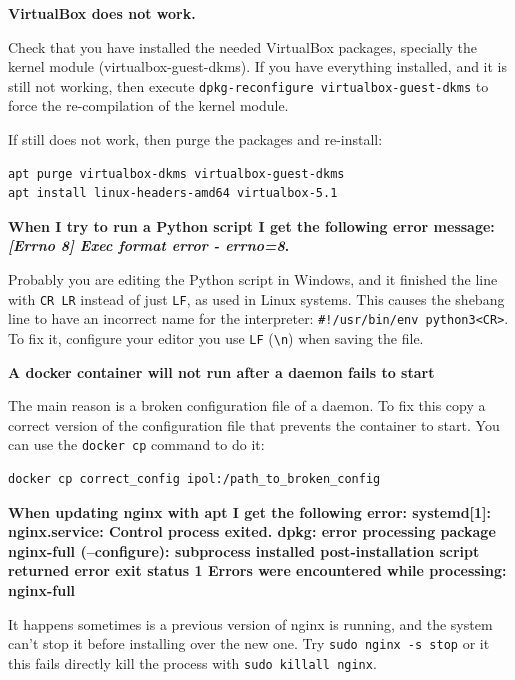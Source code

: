 \documentclass[a4paper,12pt]{article}
\begin{document}
\textbf{VirtualBox does not work.}

Check that you have installed the needed VirtualBox packages, specially the kernel module (virtualbox-guest-dkms).
If you have everything installed, and it is still not working, then execute {\tt dpkg-reconfigure virtualbox-guest-dkms} to force the re-compilation of the kernel module.

If still does not work, then purge the packages and re-install:

\begin{verbatim}
apt purge virtualbox-dkms virtualbox-guest-dkms
apt install linux-headers-amd64 virtualbox-5.1
\end{verbatim}
\vspace{0.5cm}

\textbf{When I try to run a Python script I get the following error message: \emph{[Errno 8] Exec format error - errno=8}.}

Probably you are editing the Python script in Windows, and it finished the line with {\tt CR LR} instead of just {\tt LF}, as used in Linux systems. This causes the shebang line to have an incorrect name for the interpreter: {\tt \#!/usr/bin/env python3<CR>}. To fix it, configure your editor you use {\tt LF} ({\tt \textbackslash n}) when saving the file.
\vspace{0.5cm}

\textbf{A docker container will not run after a daemon fails to start}

The main reason is a broken configuration file of a daemon. To fix this copy a correct version of the configuration file that prevents the container to start. You can use the {\tt docker cp} command to do it:

\begin{verbatim}
docker cp correct_config ipol:/path_to_broken_config
\end{verbatim}

\textbf{When updating nginx with apt I get the following error: systemd[1]: nginx.service: Control process exited. dpkg: error processing package nginx-full (--configure):  subprocess installed post-installation script returned error exit status 1 Errors were encountered while processing:  nginx-full}

It happens sometimes is a previous version of nginx is running, and the system can't stop it before installing over the new one. Try {\tt sudo nginx -s stop} or it this fails directly kill the process with {\tt sudo killall nginx}.
\vspace{0.5cm}
\end{document}
